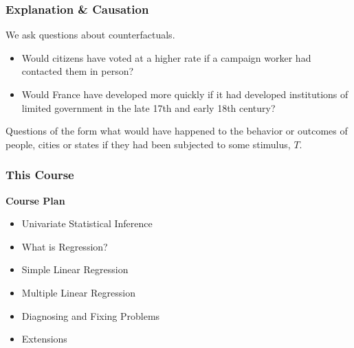 \documentclass[xcolor=svgnames,9pt,english,aspectratio=169,t]{beamer}
\begin{document}
\begin{frame}
  \frametitle{Explanation \& Causation}
We ask questions about counterfactuals.
\begin{itemize}
\item Would citizens have voted at a higher rate if a campaign worker had
contacted them in person?\pause
\item Would France have developed more quickly if it had developed
institutions of limited government in the late 17th and early 18th
century? \pause\bigskip
\end{itemize}
Questions of the form what would have happened to the behavior or outcomes
of people, cities or states if they had been subjected to some stimulus, $T$.
\end{frame}

\begin{frame}
  \frametitle{This Course}
\textbf{Course Plan}\bigskip
\begin{itemize}\itemsep1em
\item Univariate Statistical Inference
\item What is Regression?
\item Simple Linear Regression
\item Multiple Linear Regression
\item Diagnosing and Fixing Problems
\item Extensions
\end{itemize}
\end{frame}


\end{document}
